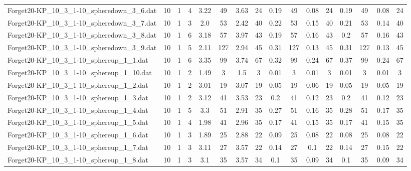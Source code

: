 \begin{sidewaystable}[!ht]
{\begin{tabular}{lccccccccccccccc}
Forget20-KP\_10\_3\_1-10\_spheredown\_3\_6.dat & 10 & 1 & 4 & 3.22 & 49 & 3.63 & 24 & 0.19 & 49 &  \textcolor{blue2}{0.08} & 24 & 0.19 & 49 &  \textcolor{blue2}{0.08} & 24 \\
Forget20-KP\_10\_3\_1-10\_spheredown\_3\_7.dat & 10 & 1 & 3 & 2.0 & 53 & 2.42 & 40 & 0.22 & 53 & 0.15 & 40 & 0.21 & 53 &  \textcolor{blue2}{0.14} & 40 \\
Forget20-KP\_10\_3\_1-10\_spheredown\_3\_8.dat & 10 & 1 & 6 & 3.18 & 57 & 3.97 & 43 & 0.19 & 57 &  \textcolor{blue2}{0.16} & 43 & 0.2 & 57 &  \textcolor{blue2}{0.16} & 43 \\
Forget20-KP\_10\_3\_1-10\_spheredown\_3\_9.dat & 10 & 1 & 5 & 2.11 & 127 & 2.94 & 45 & 0.31 & 127 &  \textcolor{blue2}{0.13} & 45 & 0.31 & 127 &  \textcolor{blue2}{0.13} & 45 \\
Forget20-KP\_10\_3\_1-10\_sphereup\_1\_1.dat & 10 & 1 & 6 & 3.35 & 99 & 3.74 & 67 & 0.32 & 99 &  \textcolor{blue2}{0.24} & 67 & 0.37 & 99 &  \textcolor{blue2}{0.24} & 67 \\
Forget20-KP\_10\_3\_1-10\_sphereup\_1\_10.dat & 10 & 1 & 2 & 1.49 & 3 & 1.5 & 3 &  \textcolor{blue2}{0.01} & 3 &  \textcolor{blue2}{0.01} & 3 &  \textcolor{blue2}{0.01} & 3 &  \textcolor{blue2}{0.01} & 3 \\
Forget20-KP\_10\_3\_1-10\_sphereup\_1\_2.dat & 10 & 1 & 2 & 3.01 & 19 & 3.07 & 19 &  \textcolor{blue2}{0.05} & 19 & 0.06 & 19 &  \textcolor{blue2}{0.05} & 19 &  \textcolor{blue2}{0.05} & 19 \\
Forget20-KP\_10\_3\_1-10\_sphereup\_1\_3.dat & 10 & 1 & 2 & 3.12 & 41 & 3.53 & 23 & 0.2 & 41 &  \textcolor{blue2}{0.12} & 23 & 0.2 & 41 &  \textcolor{blue2}{0.12} & 23 \\
Forget20-KP\_10\_3\_1-10\_sphereup\_1\_4.dat & 10 & 1 & 5 & 3.3 & 51 & 2.91 & 35 & 0.27 & 51 &  \textcolor{blue2}{0.16} & 35 & 0.28 & 51 & 0.17 & 35 \\
Forget20-KP\_10\_3\_1-10\_sphereup\_1\_5.dat & 10 & 1 & 4 & 1.98 & 41 & 2.96 & 35 & 0.17 & 41 &  \textcolor{blue2}{0.15} & 35 & 0.17 & 41 &  \textcolor{blue2}{0.15} & 35 \\
Forget20-KP\_10\_3\_1-10\_sphereup\_1\_6.dat & 10 & 1 & 3 & 1.89 & 25 & 2.88 & 22 & 0.09 & 25 &  \textcolor{blue2}{0.08} & 22 &  \textcolor{blue2}{0.08} & 25 &  \textcolor{blue2}{0.08} & 22 \\
Forget20-KP\_10\_3\_1-10\_sphereup\_1\_7.dat & 10 & 1 & 3 & 3.11 & 27 & 3.57 & 22 & 0.14 & 27 &  \textcolor{blue2}{0.1} & 22 & 0.14 & 27 & 0.15 & 22 \\
Forget20-KP\_10\_3\_1-10\_sphereup\_1\_8.dat & 10 & 1 & 3 & 3.1 & 35 & 3.57 & 34 & 0.1 & 35 &  \textcolor{blue2}{0.09} & 34 & 0.1 & 35 &  \textcolor{blue2}{0.09} & 34 \\

\end{tabular}}
\end{sidewaystable}
